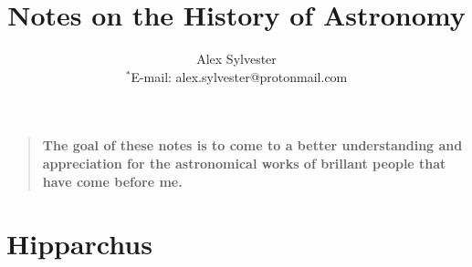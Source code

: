 \documentclass[12pt]{article}
\title{Notes on the History of Astronomy}
\author
{Alex Sylvester
\\
\normalsize{$^\ast$E-mail: alex.sylvester@protonmail.com}
}
\date{}
\newenvironment{sciabstract}{%
\begin{quote} \bf}
{\end{quote}}
\begin{document}
 


\baselineskip24pt


\maketitle 




\begin{sciabstract}
  The goal of these notes is to come to a better understanding and appreciation for the astronomical works of brillant people that have come before me.
\end{sciabstract}



\section{Hipparchus}
\end{document}
